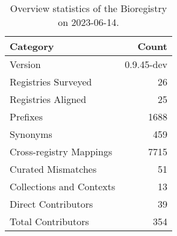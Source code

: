 \begin{table}
\caption{Overview statistics of the Bioregistry on 2023-06-14.}
\label{tab:bioregistry-summary}
\begin{tabular}{lr}
\toprule
Category & Count \\
\midrule
Version & 0.9.45-dev \\
Registries Surveyed & 26 \\
Registries Aligned & 25 \\
Prefixes & 1688 \\
Synonyms & 459 \\
Cross-registry Mappings & 7715 \\
Curated Mismatches & 51 \\
Collections and Contexts & 13 \\
Direct Contributors & 39 \\
Total Contributors & 354 \\
\bottomrule
\end{tabular}
\end{table}
